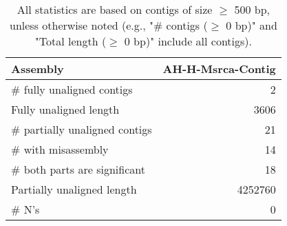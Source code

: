 \documentclass[12pt,a4paper]{article}
\begin{document}
\begin{table}[ht]
\begin{center}
\caption{All statistics are based on contigs of size $\geq$ 500 bp, unless otherwise noted (e.g., "\# contigs ($\geq$ 0 bp)" and "Total length ($\geq$ 0 bp)" include all contigs).}
\begin{tabular}{|l*{1}{|r}|}
\hline
Assembly & AH-H-Msrca-Contig \\ \hline
\# fully unaligned contigs & 2 \\ \hline
Fully unaligned length & 3606 \\ \hline
\# partially unaligned contigs & 21 \\ \hline
\hspace{5mm}\# with misassembly & 14 \\ \hline
\hspace{5mm}\# both parts are significant & 18 \\ \hline
Partially unaligned length & 4252760 \\ \hline
\# N's & 0 \\ \hline
\end{tabular}
\end{center}
\end{table}
\end{document}
